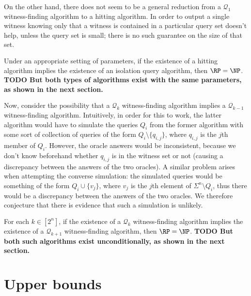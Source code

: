 \documentclass{article}
\newcommand{\todo}[1]{\textbf{TODO #1}}
\newcommand{\mc}{\mathcal}
\begin{document}
On the other hand, there does not seem to be a general reduction from a $\mc{Q}_1$ witness-finding algorithm to a hitting algorithm.
In order to output a single witness knowing only that a witness is contained in a particular query set doesn't help, unless the query set is small; there is no such guarantee on the size of that set.

\begin{conjecture}\label{conj:hitting}
  Under an appropriate setting of parameters, if the existence of a hitting algorithm implies the existence of an isolation query algorithm, then $\RP = \NP$.
  \todo{But both types of algorithms exist with the same parameters, as shown in the next section.}
\end{conjecture}

Now, consider the possibility that a $\mc{Q}_k$ witness-finding algorithm implies a $\mc{Q}_{k - 1}$ witness-finding algorithm.
Intuitively, in order for this to work, the latter algorithm would have to simulate the queries $Q_i$ from the former algorithm with some sort of collection of queries of the form $Q_i \setminus \{q_{i, j}\}$, where $q_{i, j}$ is the $j$th member of $Q_i$.
However, the oracle answers would be inconsistent, because we don't know beforehand whether $q_{i, j}$ is in the witness set or not (causing a discrepancy between the answers of the two oracles).
A similar problem arises when attempting the converse simulation: the simulated queries would be something of the form $Q_i \cup \{v_j\}$, where $v_j$ is the $j$th element of $\Sigma^n \setminus Q_i$, thus there would be a discrepancy between the answers of the two oracles.
We therefore conjecture that there is evidence that such a simulation is unlikely.

\begin{conjecture}\label{conj:ktokplus1}
  For each $k \in \left[2^n\right]$, if the existence of a $\mc{Q}_k$ witness-finding algorithm implies the existence of a $\mc{Q}_{k + 1}$ witness-finding algorithm, then $\RP = \NP$.
  \todo{But both such algorithms exist unconditionally, as shown in the next section.}
\end{conjecture}

\section{Upper bounds}
\end{document}
